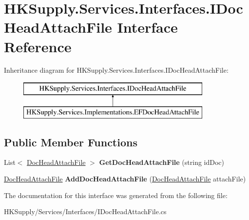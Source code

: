 \hypertarget{interface_h_k_supply_1_1_services_1_1_interfaces_1_1_i_doc_head_attach_file}{}\section{H\+K\+Supply.\+Services.\+Interfaces.\+I\+Doc\+Head\+Attach\+File Interface Reference}
\label{interface_h_k_supply_1_1_services_1_1_interfaces_1_1_i_doc_head_attach_file}
Inheritance diagram for H\+K\+Supply.\+Services.\+Interfaces.\+I\+Doc\+Head\+Attach\+File\+:\begin{figure}[H]
\begin{center}
\leavevmode
\includegraphics[height=2.000000cm]{interface_h_k_supply_1_1_services_1_1_interfaces_1_1_i_doc_head_attach_file}
\end{center}
\end{figure}
\subsection*{Public Member Functions}
\begin{DoxyCompactItemize}
\item 
\mbox{\label{interface_h_k_supply_1_1_services_1_1_interfaces_1_1_i_doc_head_attach_file_aea26daa01b08dbc2c4a1366cc6cafaee}} 
List$<$ \mbox{\hyperlink{class_h_k_supply_1_1_models_1_1_supply_1_1_doc_head_attach_file}{Doc\+Head\+Attach\+File}} $>$ {\bfseries Get\+Doc\+Head\+Attach\+File} (string id\+Doc)
\item 
\mbox{\label{interface_h_k_supply_1_1_services_1_1_interfaces_1_1_i_doc_head_attach_file_a9521d0bf1c63fc9ca5d53075a9836276}} 
\mbox{\hyperlink{class_h_k_supply_1_1_models_1_1_supply_1_1_doc_head_attach_file}{Doc\+Head\+Attach\+File}} {\bfseries Add\+Doc\+Head\+Attach\+File} (\mbox{\hyperlink{class_h_k_supply_1_1_models_1_1_supply_1_1_doc_head_attach_file}{Doc\+Head\+Attach\+File}} attach\+File)
\end{DoxyCompactItemize}


The documentation for this interface was generated from the following file\+:\begin{DoxyCompactItemize}
\item 
H\+K\+Supply/\+Services/\+Interfaces/I\+Doc\+Head\+Attach\+File.\+cs\end{DoxyCompactItemize}
